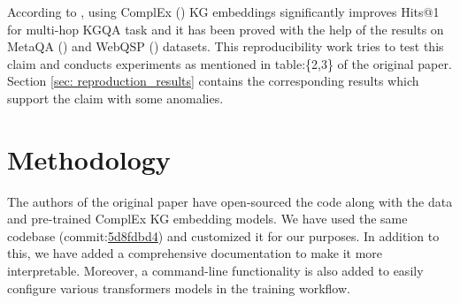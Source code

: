 



    

According to \citep{saxena-etal-2020-improving}, using ComplEx (\citep{ComplEx2016}) KG embeddings significantly improves Hits@1 for multi-hop KGQA task and it has been proved with the help of the results on MetaQA (\citep{metaqa-dataset}) and WebQSP (\citep{webqsp-dataset}) datasets. This reproducibility work tries to test this claim and conducts experiments as mentioned in table:\{2,3\} of the original paper. Section \ref{sec: reproduction_results} contains the corresponding results which support the claim with some anomalies.

\section{Methodology}
The authors of the original paper have open-sourced the code along with the data and pre-trained ComplEx KG embedding models. We have used the same codebase (commit:\href{https://github.com/malllabiisc/EmbedKGQA/tree/5d8fdbd4be77fdcb2e67a0dc8a7115844606175a}{5d8fdbd4}) and customized it for our purposes. In addition to this, we have added a comprehensive documentation to make it more interpretable. Moreover, a command-line functionality is also added to easily configure various transformers models in the training workflow.

